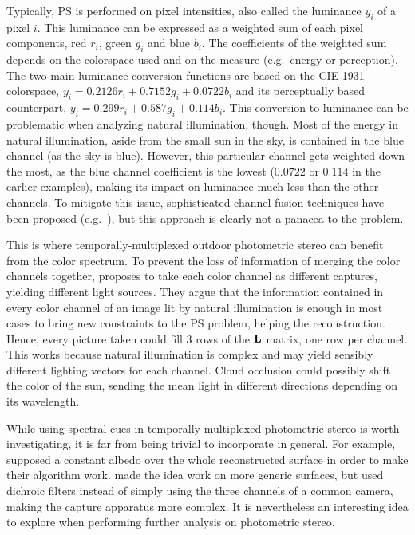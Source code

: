 \documentclass{report}
\begin{document}
Typically, PS is performed on pixel intensities, also called the luminance $y_i$ of a pixel $i$. This luminance can be expressed as a weighted sum of each pixel components, red $r_i$, green $g_i$ and blue $b_i$. The coefficients of the weighted sum depends on the colorspace used and on the measure (e.g.\ energy or perception). The two main luminance conversion functions are based on the CIE 1931 colorspace, $y_i = 0.2126r_i + 0.7152g_i + 0.0722b_i$ and its perceptually based counterpart, $y_i = 0.299r_i + 0.587g_i + 0.114b_i$. This conversion to luminance can be problematic when analyzing natural illumination, though. Most of the energy in natural illumination, aside from the small sun in the sky, is contained in the blue channel (as the sky is blue). However, this particular channel gets weighted down the most, as the blue channel coefficient is the lowest ($0.0722$ or $0.114$ in the earlier examples), making its impact on luminance much less than the other channels. To mitigate this issue, sophisticated channel fusion techniques have been proposed (e.g.\ \cite{jung-cvpr-15}), but this approach is clearly not a panacea to the problem.

This is where temporally-multiplexed outdoor photometric stereo can benefit from the color spectrum. To prevent the loss of information of merging the color channels together, \cite{johnson-cvpr-11} proposes to take each color channel as different captures, yielding different light sources. They argue that the information contained in every color channel of an image lit by natural illumination is enough in most cases to bring new constraints to the PS problem, helping the reconstruction. Hence, every picture taken could fill 3 rows of the $\mathbf{L}$ matrix, one row per channel. This works because natural illumination is complex and may yield sensibly different lighting vectors for each channel. Cloud occlusion could possibly shift the color of the sun, sending the mean light in different directions depending on its wavelength.

While using spectral cues in temporally-multiplexed photometric stereo is worth investigating, it is far from being trivial to incorporate in general. For example, \cite{johnson-cvpr-11} supposed a constant albedo over the whole reconstructed surface in order to make their algorithm work. \cite{Fyffe2011} made the idea work on more generic surfaces, but used dichroic filters instead of simply using the three channels of a common camera, making the capture apparatus more complex. It is nevertheless an interesting idea to explore when performing further analysis on photometric stereo.
\end{document}
